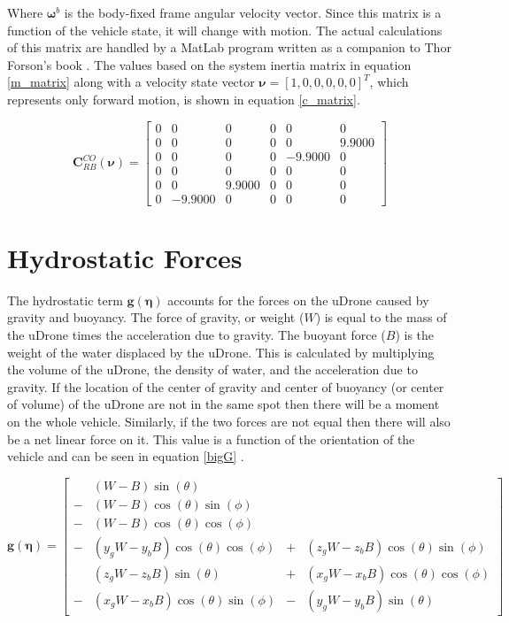 Where $\boldsymbol{\omega}^{b}$ is the body-fixed frame angular velocity vector. Since this matrix is a function of the vehicle state, it will change with motion. The actual calculations of this matrix are handled by a MatLab program written as a companion to Thor Forson’s book \parencite{mss}. The values based on the system inertia matrix in equation \ref{m_matrix} along with a velocity state vector $\bm{\nu}= [1,0,0,0,0,0]^T$, which represents only forward motion, is shown in equation \ref{c_matrix}.

\begin{equation}
\boldsymbol{C}_{RB}^{CO}(\boldsymbol{\nu})=\left[\begin{array}{cccccc}
0 & 0 & 0 & 0 & 0 & 0 \\
0 & 0 & 0 & 0 & 0 & 9.9000 \\
0 & 0 & 0 & 0 & -9.9000 & 0 \\
0 & 0 & 0 & 0 & 0 & 0 \\
0 & 0 & 9.9000 & 0 & 0 & 0 \\
0 & -9.9000 & 0 & 0 & 0 & 0
\end{array}\right]
\label{c_matrix}
\end{equation}

\section{Hydrostatic Forces} \label{hydrostatics}

The hydrostatic term $\boldsymbol{g}(\boldsymbol{\eta})$ accounts for the forces on the uDrone caused by gravity and buoyancy. The force of gravity, or weight ($W$) is equal to the mass of the uDrone times the acceleration due to gravity. The buoyant force ($B$) is the weight of the water displaced by the uDrone. This is calculated by multiplying the volume of the uDrone, the density of water, and the acceleration due to gravity. If the location of the center of gravity and center of buoyancy (or center of volume) of the uDrone are not in the same spot then there will be a moment on the whole vehicle. Similarly, if the two forces are not equal then there will also be a net linear force on it. This value is a function of the orientation of the vehicle and can be seen in equation \ref{bigG} \parencite{thor_rb}. 

\begin{equation}\label{bigG}
\boldsymbol{g}(\boldsymbol{\eta})=\left[\begin{array}{llll} 
& (W-B) \sin (\theta) \\
- & (W-B) \cos (\theta) \sin (\phi) \\
- & (W-B) \cos (\theta) \cos (\phi) \\
- & \left(y_{g} W-y_{b} B\right) \cos (\theta) \cos (\phi) & + & \left(z_{g} W-z_{b} B\right) \cos (\theta) \sin (\phi) \\
& \left(z_{g} W-z_{b} B\right) \sin (\theta) & + & \left(x_{g} W-x_{b} B\right) \cos (\theta) \cos (\phi) \\
- & \left(x_{g} W-x_{b} B\right) \cos (\theta) \sin (\phi) & - & \left(y_{g} W-y_{b} B\right) \sin (\theta)
\end{array}\right]
\end{equation}

